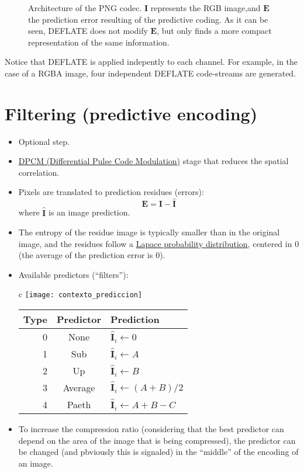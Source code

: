 \begin{figure}
  \centering
  \caption{Architecture of the PNG codec. ${\mathbf I}$ represents the
    RGB image,and ${\mathbf E}$ the prediction error resulting of the
    predictive coding. As it can be seen, DEFLATE does not modify
    ${\mathbf E}$, but only finds a more compact representation of the
    same information.}
\end{figure}

Notice that DEFLATE is applied indepently to each channel. For
example, in the case of a RGBA image, four independent DEFLATE
code-streams are generated.

\section{Filtering (predictive encoding)}
\begin{itemize}
\item Optional step.
\item
  \href{https://en.wikipedia.org/wiki/Differential_pulse-code_modulation}{DPCM
    (Differential Pulse Code Modulation)} stage that reduces the
  spatial correlation.
\item Pixels are translated to prediction residues (errors):
  \begin{equation*}
    {\mathbf E} = {\mathbf I} - \hat{\mathbf I}
  \end{equation*}
  where $\hat{\mathbf I}$ is an image prediction.
\item The entropy of the residue image is typically smaller than in
  the original image, and the residues follow a
  \href{https://en.wikipedia.org/wiki/Laplace_distribution}{Lapace
    probability distribution}, centered in 0 (the average of the
  prediction error is 0).
\item Available predictors (``filters''):
  \begin{center}
    \begin{tabular}{c}
      \texttt{[image: contexto\_prediccion]} \\
      \begin{tabular}{rcl}
        Type & Predictor & Prediction \\
        \hline
        0 &	None 	& $\hat{\mathbf I}_i\leftarrow 0$ \\
        1 &	Sub 	& $\hat{\mathbf I}_i\leftarrow A$ \\
        2 &	Up 	& $\hat{\mathbf I}_i\leftarrow B$ \\
        3 &	Average & $\hat{\mathbf I}_i\leftarrow (A+B)/2$ \\
        4 &	Paeth 	& $\hat{\mathbf I}_i\leftarrow A + B - C$
      \end{tabular}
    \end{tabular}
  \end{center}
\item To increase the compression ratio (considering that the best
  predictor can depend on the area of the image that is being
  compressed), the predictor can be changed (and pbviously this is
  signaled) in the ``middle'' of the encoding of an image.
\end{itemize}

